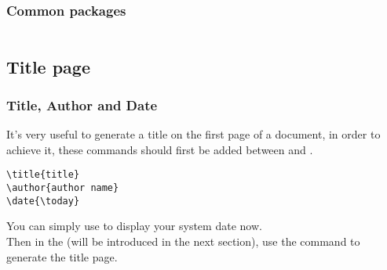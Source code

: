 \begin{frame}[fragile]
	\frametitle{Common packages}
	\inputminted{latex}{examples/packages.tex}

\end{frame}

\subsection{Title page}
\begin{frame}[fragile]
	\frametitle{Title, Author and Date}
	It's very useful to generate a title on the first page of a document, in order to achieve it, these commands should first be added between \LC{\documentclass} and \LC{}.
	\begin{example}
		\begin{verbatim}
\title{title}
\author{author name}
\date{\today}
		\end{verbatim}
	\end{example}
	You can simply use \LC{\date{\today}} to display your system date now.\\[0.5em]
	Then in the  (will be introduced in the next section), use the command \LC{\maketitle} to generate the title page.
\end{frame}


